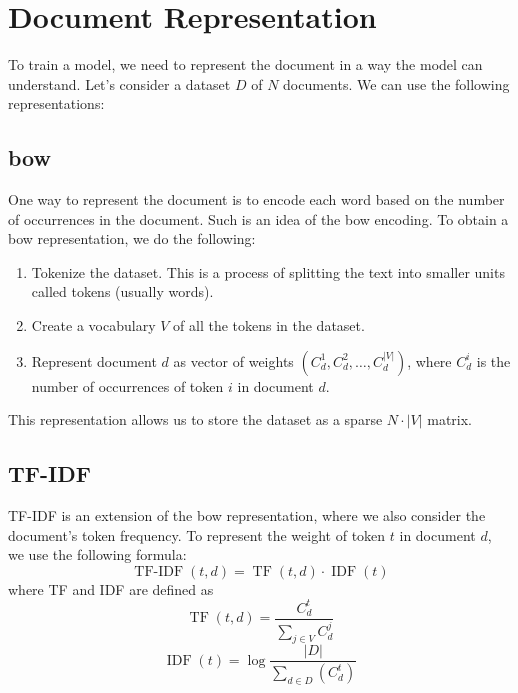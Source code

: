 \section{Document Representation}
\label{sec:representation}
To train a model, we need to represent the document in a way the model can understand.
Let's consider a dataset $D$ of $N$ documents. We can use the following representations:

\subsection{\acl{bow}}
\label{sec:bow}
One way to represent the document is to encode each word based on the number of occurrences in the document.
Such is an idea of the \acf{bow} encoding. To obtain a \ac{bow} representation, we do the following:
\begin{enumerate}
    \item Tokenize the dataset. This is a process of splitting the text into smaller units called tokens (usually words).
    \item Create a vocabulary $V$ of all the tokens in the dataset.
    \item Represent document $d$ as vector of weights $(C_{d}^1, C_{d}^2, \dots, C_{d}^{|V|})$, where $C_{d}^i$
          is the number of occurrences of token $i$ in document $d$.
\end{enumerate}
This representation allows us to store the dataset as a sparse $N \cdot |V|$ matrix.

\subsection{TF-IDF}
\label{sec:tfidf}
TF-IDF is an extension of the \ac{bow} representation, where we also consider the document's token frequency.
To represent the weight of token $t$ in document $d$, we use the following formula:
\begin{equation}
    \label{eq:tfidf}
    \operatorname{TF-IDF}(t, d) = \operatorname{TF}(t, d) \cdot \operatorname{IDF}(t)
\end{equation}
where TF and IDF are defined as
\begin{equation}
    \label{eq:tf}
    \operatorname{TF}(t, d) = \frac{C_{d}^t}{\sum_{j \in V} C_{d}^{j}}
\end{equation}
\begin{equation}
    \label{eq:idf}
    \operatorname{IDF}(t) = \log \frac{|D|}{\sum_{d \in D} (C_{d}^t)}
\end{equation}


